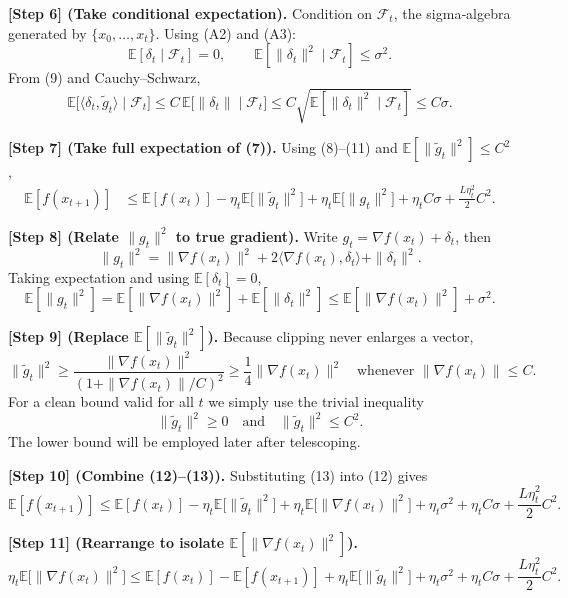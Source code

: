 \documentclass{article}
\newcommand{\E}{\mathbb{E}}
\begin{document}
\noindent\textbf{[Step 6] (Take conditional expectation).}  
Condition on $\mathcal{F}_{t}$, the sigma‑algebra generated by $\{x_{0},\dots ,x_{t}\}$.
Using (A2) and (A3):
\[
\E[\delta_{t}\mid\mathcal{F}_{t}]=0,\qquad
\E[\|\delta_{t}\|^{2}\mid\mathcal{F}_{t}]\le\sigma^{2}.
\tag{10}
\]
From (9) and Cauchy–Schwarz,
\[
\E\big[\langle\delta_{t},\tilde g_{t}\rangle\mid\mathcal{F}_{t}\big]
\le C\,\E\big[\|\delta_{t}\|\mid\mathcal{F}_{t}\big]
\le C\sqrt{\E[\|\delta_{t}\|^{2}\mid\mathcal{F}_{t}]}
\le C\sigma.
\tag{11}
\]

\noindent\textbf{[Step 7] (Take full expectation of (7)).}  
Using (8)–(11) and $\E[\|\tilde g_{t}\|^{2}]\le C^{2}$,
\[
\begin{aligned}
\E[f(x_{t+1})]
&\le \E[f(x_{t})]
-\eta_{t}\E\!\big[\|\tilde g_{t}\|^{2}\big]
+\eta_{t}\E\!\big[\|g_{t}\|^{2}\big]
+\eta_{t}C\sigma
+\frac{L\eta_{t}^{2}}{2}C^{2}.
\end{aligned}
\tag{12}
\]

\noindent\textbf{[Step 8] (Relate $\|g_{t}\|^{2}$ to true gradient).}  
Write $g_{t}= \nabla f(x_{t})+\delta_{t}$, then
\[
\|g_{t}\|^{2}= \|\nabla f(x_{t})\|^{2}+2\langle\nabla f(x_{t}),\delta_{t}\rangle+\|\delta_{t}\|^{2}.
\]
Taking expectation and using $\E[\delta_{t}]=0$,
\[
\E[\|g_{t}\|^{2}]
= \E[\|\nabla f(x_{t})\|^{2}]
+\E[\|\delta_{t}\|^{2}]
\le \E[\|\nabla f(x_{t})\|^{2}]+\sigma^{2}.
\tag{13}
\]

\noindent\textbf{[Step 9] (Replace $\E[\|\tilde g_{t}\|^{2}]$).}  
Because clipping never enlarges a vector,
\[
\|\tilde g_{t}\|^{2}\ge \frac{\|\nabla f(x_{t})\|^{2}}{(1+\|\nabla f(x_{t})\|/C)^{2}}
\ge \frac{1}{4}\|\nabla f(x_{t})\|^{2}
\quad\text{whenever }\|\nabla f(x_{t})\|\le C.
\]
For a clean bound valid for all $t$ we simply use the trivial inequality
\[
\|\tilde g_{t}\|^{2}\ge 0
\quad\text{and}\quad
\|\tilde g_{t}\|^{2}\le C^{2}.
\tag{14}
\]
The lower bound will be employed later after telescoping.

\noindent\textbf{[Step 10] (Combine (12)–(13)).}  
Substituting (13) into (12) gives
\[
\E[f(x_{t+1})]
\le \E[f(x_{t})]
-\eta_{t}\E\!\big[\|\tilde g_{t}\|^{2}\big]
+\eta_{t}\E\!\big[\|\nabla f(x_{t})\|^{2}\big]
+\eta_{t}\sigma^{2}
+\eta_{t}C\sigma
+\frac{L\eta_{t}^{2}}{2}C^{2}.
\tag{15}
\]

\noindent\textbf{[Step 11] (Rearrange to isolate $\E[\|\nabla f(x_{t})\|^{2}]$).}
\[
\eta_{t}\E\!\big[\|\nabla f(x_{t})\|^{2}\big]
\le \E[f(x_{t})]-\E[f(x_{t+1})]
+\eta_{t}\E\!\big[\|\tilde g_{t}\|^{2}\big]
+\eta_{t}\sigma^{2}
+\eta_{t}C\sigma
+\frac{L\eta_{t}^{2}}{2}C^{2}.
\tag{16}
\]
\end{document}
